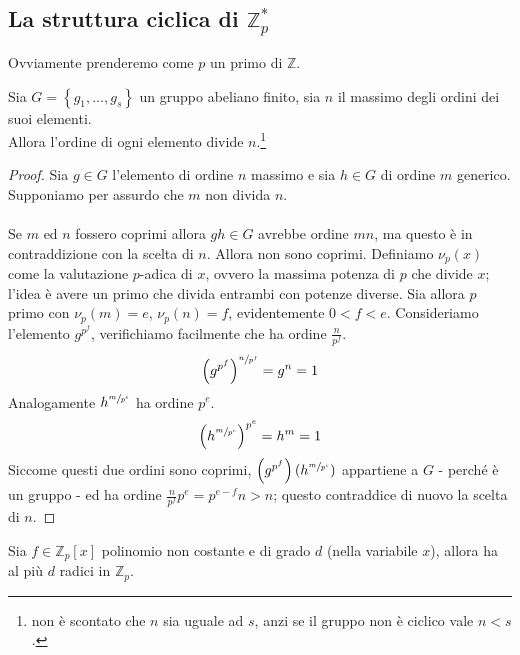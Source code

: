 \subsection{La struttura ciclica di $\mathbb{Z}^*_p$}
\label{lezione7}
Ovviamente prenderemo come $p$ un primo di $\mathbb{Z}$.
\begin{proposizione}
	Sia $G=\left\{g_1,\dots,g_s\right\}$ un gruppo abeliano finito, sia $n$ il massimo degli ordini dei suoi elementi. \\ Allora l'ordine di ogni elemento divide $n$.\footnote{non è scontato che $n$ sia uguale ad $s$, anzi se il gruppo non è ciclico vale $n<s$.}
\end{proposizione}
\begin{proof}
	Sia $g\in G$ l'elemento di ordine $n$ massimo e sia $h\in G$ di ordine $m$ generico. Supponiamo per assurdo che $m$ non divida $n$.\\ \\
	Se $m$ ed $n$ fossero coprimi allora $gh\in G$ avrebbe ordine $mn$, ma questo è in contraddizione con la scelta di $n$. Allora non sono coprimi. Definiamo $\nu_p(x)$ come la valutazione $p$-adica di $x$, ovvero la massima potenza di $p$ che divide $x$; l'idea è avere un primo che divida entrambi con potenze diverse. Sia allora $p$ primo con $\nu_p(m)=e$, $\nu_p(n)=f$, evidentemente $0<f<e$. Consideriamo l'elemento $g^{p^f}$, verifichiamo facilmente che ha ordine $\frac{n}{p^f}$. 
	\begin{equation*}
	\left(g^{p^f}\right)^{\sfrac{n}{p^f}}=g^n=1
	\end{equation*}
	Analogamente $h^{\sfrac{m}{p^e}}$ ha ordine $p^e$.
	\begin{equation*}
	\left(h^{\sfrac{m}{p^e}}\right)^{p^e}=h^m=1
	\end{equation*}
	Siccome questi due ordini sono coprimi, $\left(g^{p^f}\right)(h^{\sfrac{m}{p^e}})$ appartiene a $G$ - perché è un gruppo - ed ha ordine $\frac{n}{p^f}p^e=p^{e-f}n>n$; questo contraddice di nuovo la scelta di $n$.
\end{proof}
\begin{teorema}
	Sia $f\in\mathbb{Z}_p[x]$ polinomio non costante e di grado $d$ (nella variabile $x$), allora ha al più $d$ radici in $\mathbb{Z}_p$.
\end{teorema}
